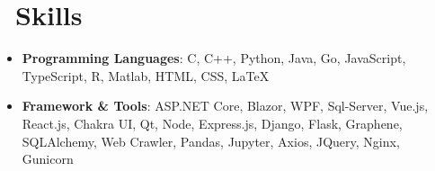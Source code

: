 \documentclass{resume}
\begin{document}

\section{\texorpdfstring{\faCogs}{}\ Skills}
\begin{itemize}[parsep=0.5ex]
  \item \textbf{Programming Languages}: C, C++, Python, Java, Go, JavaScript, TypeScript, R, Matlab, HTML, CSS, \LaTeX
  \item \textbf{Framework \& Tools}: ASP.NET Core, Blazor, WPF, Sql-Server, Vue.js, React.js, Chakra UI, Qt, Node, Express.js, Django, Flask, Graphene, SQLAlchemy, Web Crawler, Pandas, Jupyter, Axios, JQuery, Nginx, Gunicorn
\end{itemize}



%
%
\end{document}
